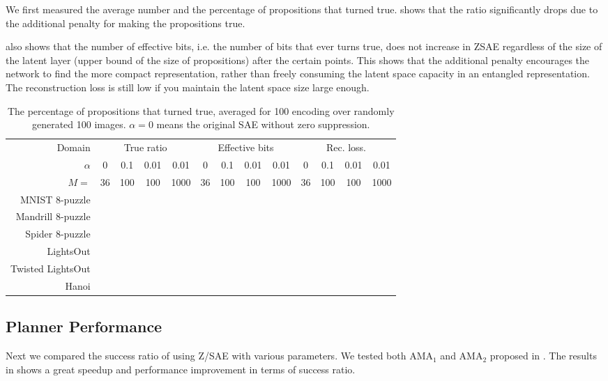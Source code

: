 We first measured the average number and the percentage of propositions that turned true.
 shows that the ratio significantly drops due to the additional penalty
for making the propositions true.

 also shows that the number of effective bits,
i.e. the number of bits that ever turns true, does not increase in ZSAE
regardless of the size of the latent layer (upper bound of the size of
propositions) after the certain points.  This shows that the additional
penalty encourages the network to find the more compact representation,
rather than freely consuming the latent space capacity in an entangled representation.
The reconstruction loss is still low if you maintain the latent space
size large enough.

\begin{table}
 \begin{tabular}{|r|*{12}{c|}}
  Domain            & \multicolumn{4}{|c|}{True ratio} & \multicolumn{4}{|c|}{Effective bits} & \multicolumn{4}{|c|}{Rec. loss.} \\
  $\alpha$          & 0  & 0.1 & 0.01 & 0.01 & 0  & 0.1 & 0.01 & 0.01 & 0  & 0.1 & 0.01 & 0.01 \\
  $M=$              & 36 & 100 & 100  & 1000 & 36 & 100 & 100  & 1000 & 36 & 100 & 100  & 1000  \\
  MNIST    8-puzzle & & & & & & & & & & & & \\
  Mandrill 8-puzzle & & & & & & & & & & & & \\
  Spider   8-puzzle & & & & & & & & & & & & \\
  LightsOut         & & & & & & & & & & & & \\
  Twisted LightsOut & & & & & & & & & & & & \\
  Hanoi             & & & & & & & & & & & & \\
 \end{tabular}
 \caption{The percentage of propositions that turned true, averaged for
 100 encoding over randomly generated 100 images.
 $\alpha=0$ means the original SAE without zero suppression.
 }
 \label{tab:true-ratio}
\end{table}

\subsection{Planner Performance}

Next we compared the success ratio of \latentplanner using Z/SAE with various parameters.
We tested both AMA$_1$ and AMA$_2$ proposed in \cite{Asai2018}.
The results in  shows a great speedup and performance improvement
in terms of success ratio.

